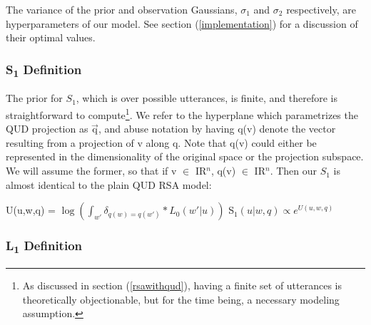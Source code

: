 \documentclass[10pt,letterpaper,twocolumn]{article}
\begin{document}
The variance of the prior and observation Gaussians, $\sigma_1$ and $\sigma_2$ respectively, are hyperparameters of our model. See section (\ref{implementation}) for a discussion of their optimal values.


\subsubsection{S\textsubscript{1} Definition}

The prior for $S_1$, which is over possible utterances, is finite, and therefore is straightforward to compute\footnote{As discussed in section (\ref{rsawithqud}), having a finite set of utterances is theoretically objectionable, but for the time being, a necessary modeling assumption.}. We refer to the hyperplane which parametrizes the QUD projection as $\overrightarrow{\text{q}}$, and abuse notation by having q(v) denote the vector resulting from a projection of v along q. Note that q(v) could either be represented in the dimensionality of the original space or the projection subspace. We will assume the former, so that if v $\in$ {\rm I\!R}$^n$, q(v) $\in$ {\rm I\!R}$^n$. Then our $S_1$ is almost identical to the plain QUD RSA model:

\begin{exe}
\ex U(u,w,q) = $\log(\int_{w'} \delta_{q(w)=q(w')} * L_0(w'\vert u))$
\ex S$_1(u\vert w,q) \propto e^{U(u,w,q)}$
\end{exe}




\subsubsection{L\textsubscript{1} Definition}
\end{document}
